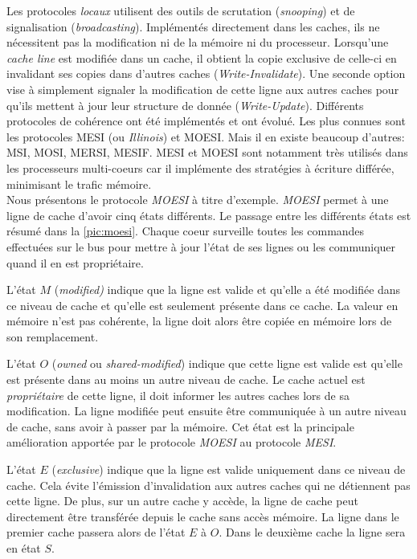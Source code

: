 Les protocoles \textit{locaux} utilisent des outils de scrutation (\textit{snooping}) et de signalisation (\textit{broadcasting}). Implémentés directement dans les caches, ils ne nécessitent pas la modification ni de la mémoire ni du processeur. Lorsqu'une \textit{cache line} est modifiée dans un cache, il obtient la copie exclusive de celle-ci en invalidant ses copies dans d'autres caches (\textit{Write-Invalidate}). Une seconde option vise à simplement signaler la modification de cette ligne aux autres caches pour qu'ils mettent à jour leur structure de donnée (\textit{Write-Update}).  Différents protocoles de cohérence ont été implémentés et ont évolué. Les plus connues sont les protocoles MESI (ou \textit{Illinois}) \cite{papamarcos1984low} et MOESI. Mais il en existe beaucoup d'autres: MSI, MOSI, MERSI, MESIF. MESI et MOESI sont notamment très utilisés dans les processeurs multi-coeurs car il implémente des stratégies à écriture différée, minimisant le trafic mémoire.
\\
Nous présentons le protocole \textit{MOESI} à titre d'exemple. \textit{MOESI}  permet à une ligne de cache d'avoir cinq états différents. Le passage entre les différents états est résumé dans la \autoref{pic:moesi}. Chaque coeur surveille toutes les commandes effectuées sur le bus pour mettre à jour l'état de ses lignes ou les communiquer quand il en est propriétaire.

L'état $M$ (\textit{modified)} indique que la ligne est valide et qu'elle a été modifiée dans ce niveau de cache et qu'elle est seulement présente dans ce cache. La valeur en mémoire n'est pas cohérente, la ligne doit alors être copiée en mémoire lors de son remplacement. 

L'état $O$ (\textit{owned} ou \textit{shared-modified}) indique que cette ligne est valide est qu'elle est présente dans au moins un autre niveau de cache. Le cache actuel est \textit{propriétaire} de cette ligne, il doit informer les autres caches lors de sa modification. La ligne modifiée peut ensuite être communiquée à un autre niveau de cache, sans avoir à passer par la mémoire. Cet état est la principale amélioration apportée par le protocole \textit{MOESI} au protocole \textit{MESI}.

L'état $E$ (\textit{exclusive}) indique que la ligne est valide uniquement dans ce niveau de cache. Cela évite l'émission d'invalidation aux autres caches qui ne détiennent pas cette ligne. De plus, sur un autre cache y accède, la ligne de cache peut directement être transférée depuis le cache sans accès mémoire. La ligne dans le premier cache passera alors de l'état $E$ à $O$. Dans le deuxième cache la ligne sera en état $S$.

